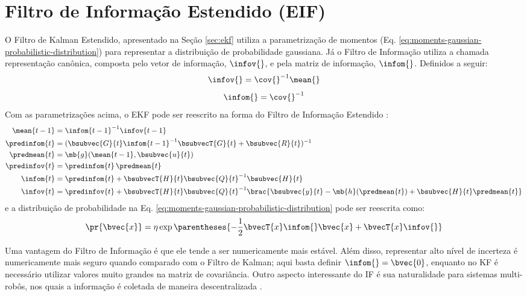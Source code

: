 \section{Filtro de Informação Estendido (EIF)}
O Filtro de Kalman Estendido, apresentado na Seção \ref{sec:ekf} utiliza a
parametrização de momentos (Eq. \ref{eq:moments-gaussian-probabilistic-distribution}) para representar a 
distribuição de probabilidade 
gaussiana. Já o Filtro de Informação utiliza a chamada representação canônica, composta pelo vetor de informação, $\infov{}$, e pela matriz de informação, $\infom{}$. Definidos a seguir:
\newcommand{\ifcorrespondence}{\infov{} = \cov{}^{-1} \mean{}}
\begin{equation}
  \ifcorrespondence 
  \label{eq:info-vector}
\end{equation}
\begin{equation}
  \infom{} = \cov{}^{-1}
  \label{eq:info-matrix}
\end{equation}
Com as parametrizações acima, o EKF pode ser reescrito na forma do Filtro de 
Informação Estendido \cite[p.~76]{bongard2006probabilistic}:
\begin{align}
  \mean{t-1} &= \infom{t-1}^{-1} \infov{t-1}
  \label{eq:eif-mean-recuperation} \\
  \predinfom{t} &= (\bsubvec{G}{t} \infom{t-1}^{-1} \bsubvecT{G}{t} + \bsubvec{R}{t})^{-1}
  \label{eq:eif-info-matrix-prediction}\\
  \predmean{t} &= \mb{g}(\mean{t-1}, \bsubvec{u}{t})
  \label{eq:eif-mean-prediction} \\
  \predinfov{t} &= \predinfom{t}\,\predmean{t}
  \label{eq:eif-info-vector-prediction} \\
  \infom{t} &= \predinfom{t} + \bsubvecT{H}{t} \bsubvec{Q}{t}^{-1} \bsubvec{H}{t}
  \label{eq:eif-info-matrix-update} \\
  \infov{t} &= \predinfov{t} + \bsubvecT{H}{t}\bsubvec{Q}{t}^{-1} 
  \brac{\bsubvec{y}{t} - \mb{h}(\predmean{t}) + \bsubvec{H}{t}\predmean{t}}
  \label{eq:eif-info-vector-update}
\end{align}
e a distribuição de probabilidade na Eq. \ref{eq:moments-gaussian-probabilistic-distribution} pode ser reescrita como:
\begin{equation}
  \pr{\bvec{x}} = \eta \exp\parentheses{-\frac{1}{2} 
  \bvecT{x} \infom{} \bvec{x} + \bvecT{x}\infov{}}
  \label{eq:canonical-gaussian-probabilistic-distribution}
\end{equation}

Uma vantagem do Filtro de Informação é que ele tende a ser numericamente mais estável. Além disso, 
representar alto nível de incerteza é numericamente mais seguro quando comparado 
com o Filtro de Kalman; aqui basta definir $\infom{} = \bvec{0}$, enquanto no KF 
é necessário utilizar valores muito grandes na matriz de covariância. Outro 
aspecto interessante do IF é sua naturalidade para sistemas multi-robôs, nos quais a 
informação é coletada de maneira descentralizada \cite[p.~78]{bongard2006probabilistic}.

